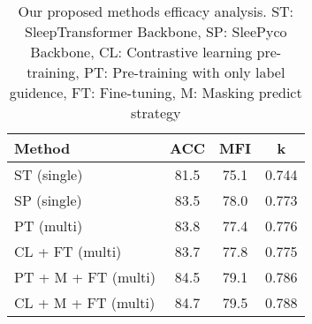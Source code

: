 \begin{table}[H]
\setlength{\tabcolsep}{10pt}
\caption{Our proposed methods efficacy analysis. ST: SleepTransformer Backbone, SP: SleePyco Backbone, CL: Contrastive learning pre-training, PT: Pre-training with only label guidence, FT: Fine-tuning, M: Masking predict strategy}
\label{table5}
\begin{tabular}{l|c|c|c}
\hline
\textbf{Method} & \textbf{ACC} & \textbf{MFI} & \textbf{k} \\
\hline
ST (single) & 81.5 & 75.1 & 0.744 \\
\hline
SP (single) & 83.5 & 78.0 & 0.773 \\
\hline
PT (multi) & 83.8 & 77.4 & 0.776 \\
\hline
CL + FT (multi) & 83.7 & 77.8 & 0.775 \\
\hline
PT + M + FT (multi) & 84.5 & 79.1 & 0.786 \\
\hline
CL + M + FT (multi) & 84.7 & 79.5 & 0.788 \\
\hline
\end{tabular}
\end{table}
